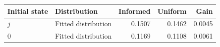 \begin{tabular}{llrrr}\toprule
Initial state & Distribution & Informed & Uniform & Gain\\\midrule
$j$ & Fitted distribution & 0.1507 & 0.1462 & 0.0045 \\
$0$ & Fitted distribution & 0.1169 & 0.1108 & 0.0061 \\
\bottomrule\end{tabular}

